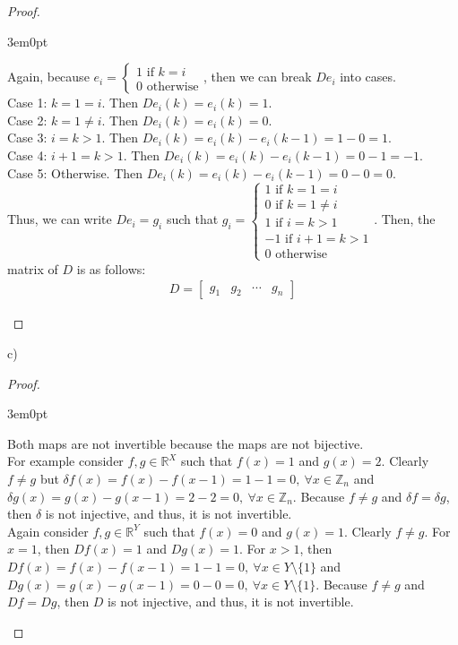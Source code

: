 \documentclass[11pt]{article}
\newcommand{\R}{\mathbb{R}}
\newcommand{\Z}{\mathbb{Z}}
\newenvironment{myproof}
{\begin{proof} \begin{adjustwidth}{3em}{0pt}$ $\par\nobreak\ignorespaces}
{\end{adjustwidth} \end{proof}}
\begin{document}
\begin{flushleft}
\begin{myproof}
Again, because $e_i = \begin{cases} 1 \text{ if } k = i \\ 0 \text{ otherwise} \end{cases}$, then we can break $D e_i$ into cases. \\
\bigskip
Case 1: $k = 1 = i$. Then $De_i(k) = e_i(k) = 1$. \\
Case 2: $k = 1 \neq i$. Then $De_i(k) = e_i(k) = 0$. \\
Case 3: $i = k > 1$. Then $De_i(k) = e_i(k) - e_i(k-1) = 1 - 0 = 1$. \\
Case 4: $i + 1 = k > 1$. Then $De_i(k) = e_i(k) - e_i(k-1) = 0 - 1 = -1$. \\
Case 5: Otherwise. Then $De_i(k) = e_i(k) - e_i(k-1) = 0 - 0 = 0$. \\
\bigskip
Thus, we can write $De_i = g_i$ such that $g_i = \begin{cases} 1 \text{ if } k = 1 = i \\ 0 \text{ if } k = 1 \neq i \\ 1 \text{ if }i = k > 1 \\ -1 \text{ if }i + 1 = k > 1 \\ 0 \text{ otherwise} \end{cases}$. Then, the matrix of $D$ is as follows:
\begin{align*}
D=
\begin{bmatrix}
g_1 & g_2 & \cdots & g_n 
\end{bmatrix}
\end{align*}

\end{myproof}

c)

\begin{myproof}

Both maps are not invertible because the maps are not bijective.\\
\bigskip
For example consider $f,g \in \R^X$ such that $f(x) = 1$ and $g(x) = 2$. Clearly $f \neq g$ but $\delta f(x) = f(x) - f(x-1) = 1 - 1 = 0, \ \forall x \in \Z_n$ and $\delta g(x) = g(x) - g(x-1) = 2 - 2 = 0, \ \forall x \in \Z_n$. Because $f \neq g$ and $\delta f = \delta g$, then $\delta$ is not injective, and thus, it is not invertible.\\
\bigskip
Again consider $f, g \in \R^Y$ such that $f(x) = 0$ and $g(x) = 1$. Clearly $f \neq g$. For $x = 1$, then $Df(x) = 1$ and $Dg(x) = 1$. For $x > 1$, then $Df(x) = f(x) - f(x-1) = 1 - 1 = 0, \ \forall x \in Y \setminus \{ 1 \}$ and $Dg(x) = g(x) - g(x-1) = 0 - 0 = 0, \ \forall x \in Y \setminus \{ 1 \}$. Because $f \neq g$ and $Df = Dg$, then $D$ is not injective, and thus, it is not invertible.


\end{myproof}
\end{flushleft}
\end{document}
